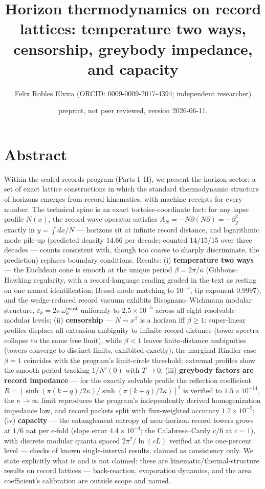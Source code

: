 \documentclass[11pt]{article}
\title{Horizon thermodynamics on record lattices: temperature two ways, censorship, greybody impedance, and capacity}
\author{Felix Robles Elvira (ORCID: 0009-0009-2017-4394; independent researcher)}
\date{\small preprint, not peer reviewed, version 2026-06-11.}
\begin{document}
\maketitle

\section*{Abstract}
Within the sealed-records program (Parts I–II), we present the horizon sector: a set of exact lattice constructions in which the standard thermodynamic structure of horizons emerges from record kinematics, with machine receipts for every number.  The technical spine is an exact tortoise-coordinate fact: for any lapse profile $N(x)$, the record wave operator satisfies $A_N = -N\partial(N \partial) = -\partial_y^2$ exactly in $y = \int dx/N$ — horizons sit at infinite record distance, and logarithmic mode pile-up (predicted density $14.66$ per decade; counted $14/15/15$ over three decades — counts consistent with, though too coarse to sharply discriminate, the prediction) replaces boundary conditions.  Results: (i) \textbf{temperature two ways} — the Euclidean cone is smooth at the unique period $\beta = 2\pi/\kappa$ (Gibbons–Hawking regularity, with a record-language reading graded in the text as resting on one named identification; Bessel-mode matching to $10^{-5}$, tip exponent $0.9997$), and the wedge-reduced record vacuum exhibits Bisognano–Wichmann modular structure, $\varepsilon_k = 2\pi\,\omega_k^{\mathrm{boost}}$ uniformly to $2.5\times 10^{-5}$ across all eight resolvable modular levels; (ii) \textbf{censorship} — $N \sim x^\beta$ is a horizon iff $\beta \ge 1$: super-linear profiles displace all extension ambiguity to infinite record distance (tower spectra collapse to the same free limit), while $\beta < 1$ leaves finite-distance ambiguities (towers converge to distinct limits, exhibited exactly); the marginal Rindler case $\beta = 1$ coincides with the program's limit-circle threshold; extremal profiles show the smooth period tracking $1/N'(0)$ with $T \to 0$; (iii) \textbf{greybody factors are record impedance} — for the exactly solvable profile the reflection coefficient $R = [\sinh(\pi(k-q)/2\kappa)/\sinh(\pi(k+q)/2\kappa)]^2$ is verified to $1.5\times 10^{-14}$, the $\kappa \to \infty$ limit reproduces the program's independently derived homogenization impedance law, and record packets split with flux-weighted accuracy $1.7\times 10^{-5}$; (iv) \textbf{capacity} — the entanglement entropy of near-horizon record towers grows at $1/6$ nat per e-fold (slope error $4.4\times 10^{-4}$; the Calabrese–Cardy $c/6$ at $c = 1$), with discrete modular quanta spaced $2\pi^2/\ln(cL)$ verified at the one-percent level — checks of known single-interval results, claimed as consistency only.  We state explicitly what is and is not claimed: these are kinematic/thermal-structure results on record lattices — back-reaction, evaporation dynamics, and the area coefficient's calibration are outside scope and named.
\end{document}

